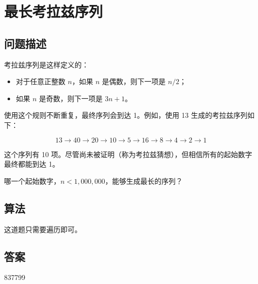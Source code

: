 \section{最长考拉兹序列}\label{sec:problem14}
\subsection{问题描述}
\begin{tcolorbox}
考拉兹序列是这样定义的：

\begin{itemize}
    \item 对于任意正整数 $n$，如果 $n$ 是偶数，则下一项是 $n / 2$；
    \item 如果 $n$ 是奇数，则下一项是 $3n + 1$。
\end{itemize}

使用这个规则不断重复，最终序列会到达 1。例如，使用 13 生成的考拉兹序列如下：

\[
13 \to 40 \to 20 \to 10 \to 5 \to 16 \to 8 \to 4 \to 2 \to 1
\]

这个序列有 10 项。尽管尚未被证明（称为考拉兹猜想），但相信所有的起始数字最终都能到达 1。

哪一个起始数字，$n < 1,000,000$，能够生成最长的序列？
\end{tcolorbox}

\subsection{算法}
这道题只需要遍历即可。

\subsection{答案}
837799
